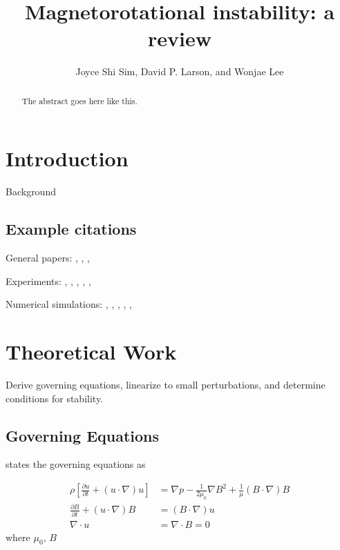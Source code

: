 \documentclass{jfm}
\title[Magnetorotational instability]{Magnetorotational instability: a review}
\author[J.~S. Sim, D.~P. Larson, and W. Lee]{Joyce Shi Sim, David P. Larson, 
    and Wonjae Lee}
\affiliation{University of California, San Diego}
\newcommand{\del}{\nabla}
\begin{document}
\maketitle


\begin{abstract}
The abstract goes here like this.
\end{abstract}


\section{Introduction}
\label{sec:intro}
Background

\subsection{Example citations}
General papers: \cite{Julien2010}, \cite{Chandrasekhar1960}, \cite{Acheson1973},
\cite{Balbus1991}

Experiments: \cite{Gailitis2002}, \cite{Sisan2004}, \cite{Stefani2006},
\cite{Stefani2007}, \cite{Ji2010}, \cite{Seilmayer2012}

Numerical simulations: \cite{Kageyama2004}, \cite{Liu2008}, \cite{Gissinger2011}, 
\cite{Travnikov2011}, \cite{Kirillov2012}, \cite{Zhao2012}



\section{Theoretical Work}
\label{sec:theory}
Derive governing equations, linearize to small perturbations, and determine 
conditions for stability.

\subsection{Governing Equations}
\cite{Julien2010} states the governing equations as

\begin{align}
    \rho \left[ \frac{\partial u}{\partial t} + (u \cdot \del) u \right] &= \del p - \frac{1}{2 \mu_0} \del B^2 + \frac{1}{\mu} (B \cdot \del) B \\
    \frac{\partial B}{\partial t} + (u \cdot \del) B &= (B \cdot \del) u \\
    \del \cdot u &= \del \cdot B = 0
\end{align}
where $\mu_0$, $B$
\end{document}
